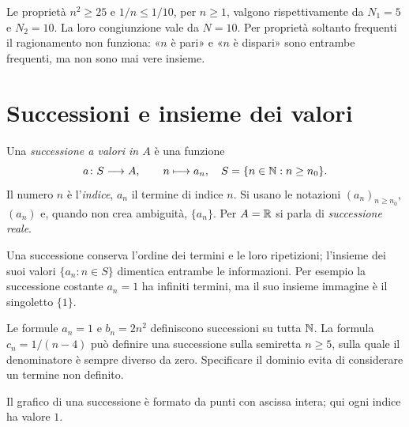 \begin{esempio}
Le proprietà $n^2\ge25$ e $1/n\le1/10$, per $n\ge1$, valgono rispettivamente da $N_1=5$ e $N_2=10$. La loro congiunzione vale da $N=10$. Per proprietà soltanto frequenti il ragionamento non funziona: «$n$ è pari» e «$n$ è dispari» sono entrambe frequenti, ma non sono mai vere insieme.
\end{esempio}

\section{Successioni e insieme dei valori}

\begin{definizione}[Successione]
Una \emph{successione a valori in $A$} è una funzione
\[
a\colon S\longrightarrow A,\qquad n\longmapsto a_n,
\quad S=\{n\in\mathbb{N}:n\ge n_0\}.
\]
Il numero $n$ è l'\emph{indice}, $a_n$ il termine di indice $n$. Si usano le notazioni $(a_n)_{n\ge n_0}$, $(a_n)$ e, quando non crea ambiguità, $\{a_n\}$. Per $A=\mathbb{R}$ si parla di \emph{successione reale}.
\end{definizione}

Una successione conserva l'ordine dei termini e le loro ripetizioni; l'insieme dei suoi valori $\{a_n:n\in S\}$ dimentica entrambe le informazioni. Per esempio la successione costante $a_n=1$ ha infiniti termini, ma il suo insieme immagine è il singoletto $\{1\}$.

\begin{esempio}
Le formule $a_n=1$ e $b_n=2n^2$ definiscono successioni su tutta $\mathbb{N}$. La formula $c_n=1/(n-4)$ può definire una successione sulla semiretta $n\ge5$, sulla quale il denominatore è sempre diverso da zero. Specificare il dominio evita di considerare un termine non definito.
\end{esempio}

\begin{schema}
\par\smallskip Il grafico di una successione è formato da punti con ascissa intera; qui ogni indice ha valore $1$.
\end{schema}

